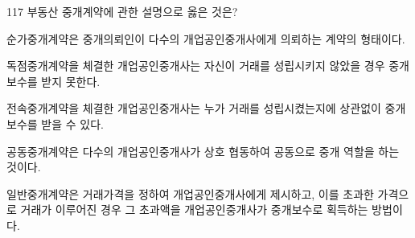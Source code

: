 \begin{question}{117}
부동산 중개계약에 관한 설명으로 옳은 것은?
\begin{choices}
  \item 순가중개계약은 중개의뢰인이 다수의 개업공인중개사에게 의뢰하는 계약의 형태이다.
  \item 독점중개계약을 체결한 개업공인중개사는 자신이 거래를 성립시키지 않았을 경우 중개보수를 받지 못한다.
  \item 전속중개계약을 체결한 개업공인중개사는 누가 거래를 성립시켰는지에 상관없이 중개보수를 받을 수 있다.
  \item 공동중개계약은 다수의 개업공인중개사가 상호 협동하여 공동으로 중개 역할을 하는 것이다.
  \item 일반중개계약은 거래가격을 정하여 개업공인중개사에게 제시하고, 이를 초과한 가격으로 거래가 이루어진 경우 그 초과액을 개업공인중개사가 중개보수로 획득하는 방법이다.
\end{choices}
\end{question}
